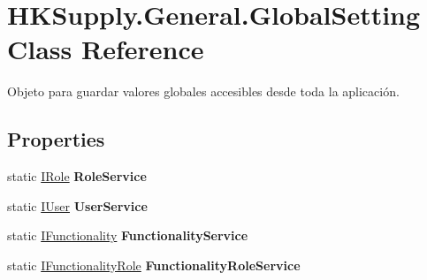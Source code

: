 \hypertarget{class_h_k_supply_1_1_general_1_1_global_setting}{}\section{H\+K\+Supply.\+General.\+Global\+Setting Class Reference}
\label{class_h_k_supply_1_1_general_1_1_global_setting}


Objeto para guardar valores globales accesibles desde toda la aplicación.  


\subsection*{Properties}
\begin{DoxyCompactItemize}
\item 
\mbox{\label{class_h_k_supply_1_1_general_1_1_global_setting_a6bfb54fe6ce82b0427c93287f3174fcc}} 
static \hyperlink{interface_h_k_supply_1_1_services_1_1_interfaces_1_1_i_role}{I\+Role} {\bfseries Role\+Service}
\item 
\mbox{\label{class_h_k_supply_1_1_general_1_1_global_setting_afcf3f82e4605ee135bef3b76601faef8}} 
static \hyperlink{interface_h_k_supply_1_1_services_1_1_interfaces_1_1_i_user}{I\+User} {\bfseries User\+Service}
\item 
\mbox{\label{class_h_k_supply_1_1_general_1_1_global_setting_aa4423c9bf929f499c03e32ebee39d7bc}} 
static \hyperlink{interface_h_k_supply_1_1_services_1_1_interfaces_1_1_i_functionality}{I\+Functionality} {\bfseries Functionality\+Service}
\item 
\mbox{\label{class_h_k_supply_1_1_general_1_1_global_setting_a6e0c94569c8e737d382725931c272390}} 
static \hyperlink{interface_h_k_supply_1_1_services_1_1_interfaces_1_1_i_functionality_role}{I\+Functionality\+Role} {\bfseries Functionality\+Role\+Service}

\end{DoxyCompactItemize}
